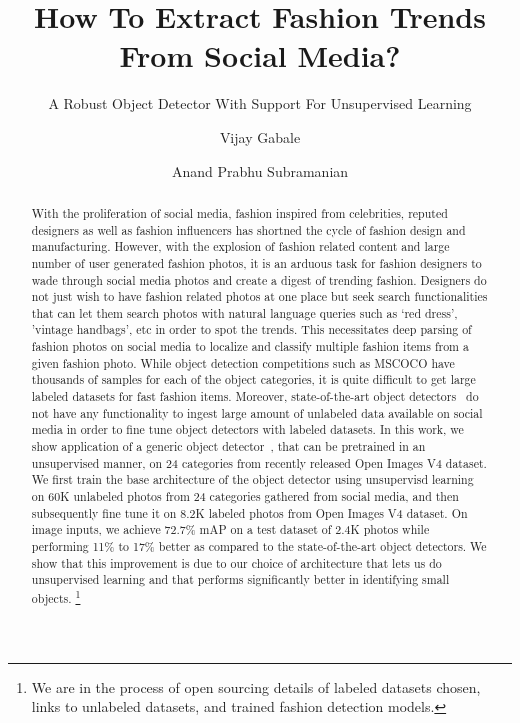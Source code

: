 \documentclass[sigconf]{acmart}
\begin{document}
\sloppy

\title{How To Extract Fashion Trends From Social Media?}
\subtitle{A Robust Object Detector With Support For Unsupervised Learning}

\author{Vijay Gabale}

\author{Anand Prabhu Subramanian}


\begin{abstract}
With the proliferation of social media,
fashion inspired from celebrities, reputed designers
as well as fashion influencers has 
shortned the cycle of fashion design and manufacturing.
However, with the explosion of fashion related content
and large number of user generated fashion photos,
it is an arduous task for fashion designers to wade through
social media photos and create a digest
of trending fashion.
Designers do not just wish to have fashion related photos
at one place but seek search functionalities that can let them
search photos with natural language queries such as
`red dress', 'vintage handbags', etc in order to spot the trends.
This necessitates deep parsing of fashion photos on social
media to localize and classify multiple fashion items from a
given fashion photo.
While object detection competitions such as MSCOCO have thousands
of samples for each of the object categories, it is quite difficult
to get large labeled datasets for fast fashion items.
Moreover, state-of-the-art object detectors~\cite{LiuAESRFB16,RedmonCVPR16,FuLRTB17}
do not have any functionality to ingest large amount of unlabeled data
available on social media in order to fine tune object detectors with labeled datasets.
In this work, we show application of a generic object detector~\cite{CDSSD18}, that can 
be pretrained in an unsupervised manner, on 24 categories
from recently released Open Images V4 dataset.
We first train the base architecture of the object detector using
unsupervisd learning on 60K unlabeled photos from 24 categories gathered
from social media, and then subsequently fine tune it on
8.2K labeled photos from Open Images V4 dataset.
On  image inputs, 
we achieve 72.7\% mAP on a test dataset of 2.4K photos while
performing 11\% to 17\% better as compared to the state-of-the-art
object detectors. 
We show that this improvement is due to our choice
of architecture that lets us do unsupervised learning and that
performs significantly better in identifying small objects.
\footnote{We are in the process of open sourcing details of labeled datasets
chosen, links to unlabeled datasets, and trained fashion detection models.}

\end{abstract}
\end{document}
